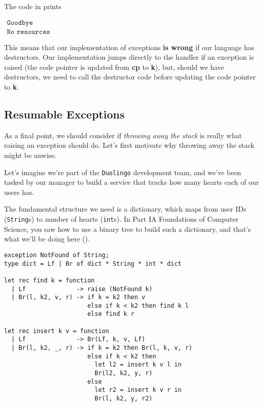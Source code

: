 The code in  prints

$\begin{array}{l}
     \texttt{Goodbye}  \\
     \texttt{No resources}
\end{array}$

This means that our implementation of exceptions \textbf{is wrong} if our language has destructors. Our implementation jumps directly to the handler if an exception is raised (the code pointer is updated from \textbf{cp} to \textbf{k}), but, should we have destructors, we need to call the destructor code before updating the code pointer to \textbf{k}.

\subsection{Resumable Exceptions}
As a final point, we should consider if \textit{throwing away the stack} is really what raising an exception should do. Let's first motivate why throwing away the stack might be unwise. 

Let's imagine we're part of the \texttt{Duolingo} development team, and we've been tasked by our manager to build a service that tracks how many hearts each of our users has. 

The fundamental structure we need is a dictionary, which maps from user IDs (\texttt{String}s) to number of hearts (\texttt{int}s). In \textsf{Part IA Foundations of Computer Science}, you saw how to use a binary tree to build such a dictionary, and that's what we'll be doing here (). 

\begin{code}
\label{code:ocaml-dict-suite}
\begin{verbatim}
exception NotFound of String;
type dict = Lf | Br of dict * String * int * dict

let rec find k = function
  | Lf              -> raise (NotFound k)
  | Br(l, k2, v, r) -> if k = k2 then v
                       else if k < k2 then find k l
                       else find k r
                   
let rec insert k v = function
  | Lf              -> Br(Lf, k, v, Lf)
  | Br(l, k2, _, r) -> if k = k2 then Br(l, k, v, r)
                       else if k < k2 then 
                         let l2 = insert k v l in
                         Br(l2, k2, y, r)
                       else 
                         let r2 = insert k v r in 
                         Br(l, k2, y, r2)
\end{verbatim}
\end{code}

